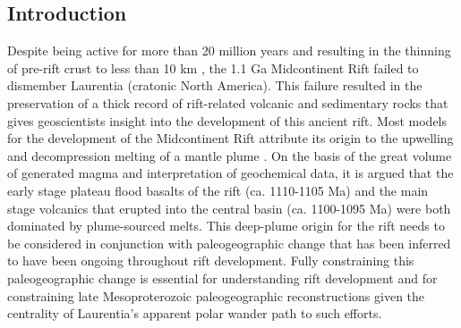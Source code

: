 \documentclass[draft,gc]{AGUTeX}
\begin{document}
\begin{article}

%
%

\section{Introduction}
Despite being active for more than 20 million years \citep{Davis1997a} and resulting in the thinning of pre-rift crust to less than 10 km \citep{Cannon1992b}, the 1.1 Ga Midcontinent Rift failed to dismember Laurentia (cratonic North America). This failure resulted in the preservation of a thick record of rift-related volcanic and sedimentary rocks that gives geoscientists insight into the development of this ancient rift. Most models for the development of the Midcontinent Rift attribute its origin to the upwelling and decompression melting of a mantle plume \citep{Shirey1997a}. On the basis of the great volume of generated magma and interpretation of geochemical data, it is argued that the early stage plateau flood basalts of the rift (ca. 1110-1105 Ma) and the main stage volcanics that erupted into the central basin (ca. 1100-1095 Ma) were both dominated by plume-sourced melts. This deep-plume origin for the rift needs to be considered in conjunction with paleogeographic change that has been inferred to have been ongoing throughout rift development. Fully constraining this paleogeographic change is essential for understanding rift development and for constraining late Mesoproterozoic paleogeographic reconstructions given the centrality of Laurentia's apparent polar wander path to such efforts.


\end{article}
\end{document}
